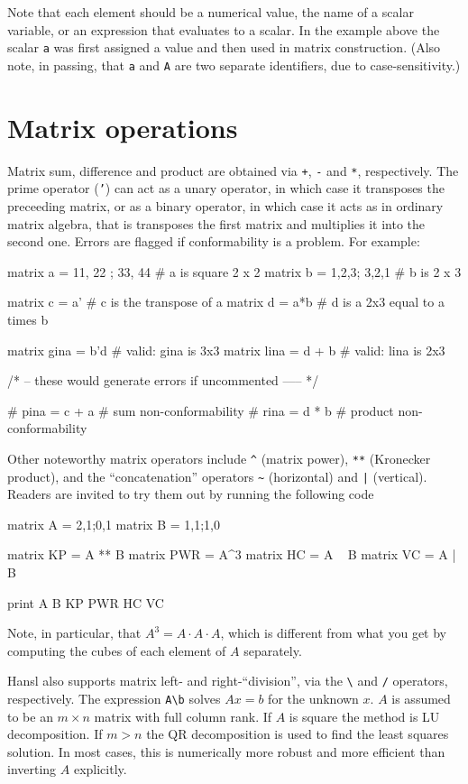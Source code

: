 Note that each element should be a numerical value, the name of a
scalar variable, or an expression that evaluates to a scalar. In the
example above the scalar \texttt{a} was first assigned a value and
then used in matrix construction. (Also note, in passing, that
\texttt{a} and \texttt{A} are two separate identifiers, due to
case-sensitivity.)

\section{Matrix operations}
\label{sec:mat-op}

Matrix sum, difference and product are obtained via \texttt{+},
\texttt{-} and \texttt{*}, respectively. The prime operator
(\texttt{'}) can act as a unary operator, in which case it transposes
the preceeding matrix, or as a binary operator, in which case it acts
as in ordinary matrix algebra, that is transposes the first matrix and
multiplies it into the second one. Errors are flagged if
conformability is a problem. For example:
\begin{code}
  matrix a = {11, 22 ; 33, 44}  # a is square 2 x 2
  matrix b = {1,2,3; 3,2,1}     # b is 2 x 3

  matrix c = a'         # c is the transpose of a
  matrix d = a*b        # d is a 2x3 equal to a times b

  matrix gina = b'd     # valid: gina is 3x3
  matrix lina = d + b   # valid: lina is 2x3

  /* -- these would generate errors if uncommented ----- */

  # pina = c + a  # sum non-conformability
  # rina = d * b  # product non-conformability
\end{code}

Other noteworthy matrix operators include \texttt{\^} (matrix power),
\texttt{**} (Kronecker product), and the ``concatenation'' operators
\verb|~| (horizontal) and \texttt{|} (vertical). Readers are invited
to try them out by running the following code
\begin{code}
matrix A = {2,1;0,1}
matrix B = {1,1;1,0}

matrix KP = A ** B
matrix PWR = A^3 
matrix HC = A ~ B
matrix VC = A | B

print A B KP PWR HC VC
\end{code}
Note, in particular, that $A^3 = A \cdot A \cdot A$, which is different
from what you get by computing the cubes of each element of $A$
separately.

Hansl also supports matrix left- and right-``division'', via the
\verb'\' and \verb'/' operators, respectively. The expression
\verb|A\b| solves $Ax = b$ for the unknown $x$. $A$ is assumed to be
an $m \times n$ matrix with full column rank. If $A$ is square the
method is LU decomposition. If $m > n$ the QR decomposition is used to
find the least squares solution. In most cases, this is numerically
more robust and more efficient than inverting $A$ explicitly.

